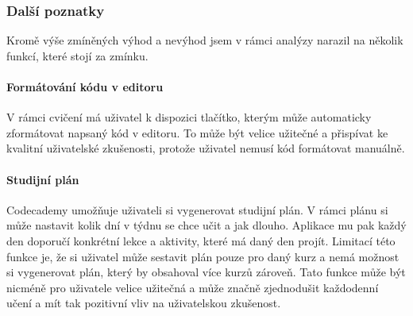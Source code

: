 \subsubsection{Další poznatky}

Kromě výše zmíněných výhod a nevýhod jsem v rámci analýzy narazil na několik funkcí, které stojí za zmínku.

\paragraph{Formátování kódu v editoru} V rámci cvičení má uživatel k dispozici tlačítko, kterým může automaticky zformátovat napsaný kód v editoru. To může být velice užitečné a přispívat ke kvalitní uživatelské zkušenosti, protože uživatel nemusí kód formátovat manuálně.

\paragraph{Studijní plán} Codecademy umožňuje uživateli si vygenerovat studijní plán. V rámci plánu si může nastavit kolik dní v týdnu se chce učit a jak dlouho. Aplikace mu pak každý den doporučí konkrétní lekce a aktivity, které má daný den projít. Limitací této funkce je, že si uživatel může sestavit plán pouze pro daný kurz a nemá možnost si vygenerovat plán, který by obsahoval více kurzů zároveň. Tato funkce může být nicméně pro uživatele velice užitečná a může značně zjednodušit každodenní učení a mít tak pozitivní vliv na uživatelskou zkušenost.
